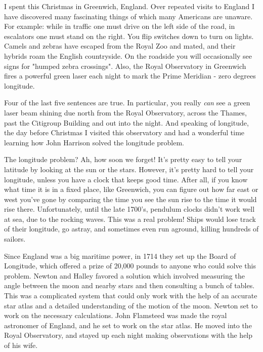 


I spent this Christmas in Greenwich, England.  Over repeated visits 
to England I have discovered many fascinating things of which many
Americans are unaware.  For example: while in traffic one must drive on
the left side of the road, in escalators one must stand on the right. 
You flip switches down to turn on lights.   Camels and zebras have
escaped from the Royal Zoo and mated, and their hybrids roam the English
countryside.  On the roadside you will occasionally see signs for
"humped zebra crossings".  Also, the Royal Observatory in Greenwich
fires a powerful green laser each night to mark the Prime Meridian -
zero degrees longitude.

Four of the last five sentences are true.  In particular, you really
\emph{can} see a green laser beam shining due north from the Royal 
Observatory, across the Thames, past the Citigroup Building and out 
into the night.  And speaking of longitude, the day before Christmas  
I visited this observatory and had a wonderful time learning how John
Harrison solved the longitude problem.  

The longitude problem?  Ah, how soon we forget!  It's pretty easy to
tell your latitude by looking at the sun or the stars.  However, it's
pretty hard to tell your longitude, unless you have a clock that keeps
good time.  After all, if you know what time it is in a fixed place,
like Greenwich, you can figure out how far east or west you've gone by
comparing the time you see the sun rise to the time it would rise there.
Unfortunately, until the late 1700's, pendulum clocks didn't work well
at sea, due to the rocking waves.  This was a real problem!  Ships would
lose track of their longitude, go astray, and sometimes even run aground, 
killing hundreds of sailors.  

Since England was a big maritime power, in 1714 they set up the Board of
Longitude, which offered a prize of 20,000 pounds to anyone who could
solve this problem.  Newton and Halley favored a solution which involved
measuring the angle between the moon and nearby stars and then consulting 
a bunch of tables.  This was a complicated system that could only work
with the help of an accurate star atlas and a detailed understanding of
the motion of the moon.  Newton set to work on the necessary calculations.  
John Flamsteed was made the royal astronomer of England, and he set to work 
on the star atlas.  He moved into the Royal Observatory, and stayed up each 
night making observations with the help of his wife.

